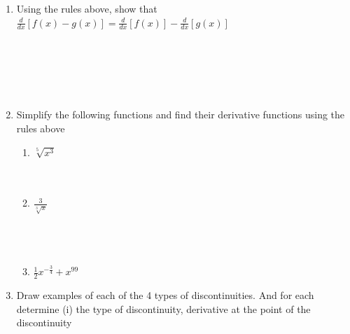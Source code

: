 \documentclass[12pt]{report}
\begin{document}
\begin{enumerate}
\item Using the rules above, show that $\displaystyle{\frac{d}{dx}\left[f(x)-g(x)\right]}=\displaystyle{\frac{d}{dx}\left[f(x)\right]-\frac{d}{dx}\left[g(x)\right]}$\\\\\\\\\\\\

\item Simplify the following functions and find their derivative functions using the rules above

\begin{enumerate}[label=\alph*.]
    \item $\displaystyle{\sqrt[5]{x^{3}}}$\\\\\\
    \item $\displaystyle{\frac{3}{\sqrt[3]{x}}}$\\\\\\\\
    \item $\displaystyle{\frac{1}{2}x^{-\frac{3}{4}}}+x^{99}$
\end{enumerate}
\newpage
\item Draw examples of each of the 4 types of discontinuities. And for each determine (i) the type of discontinuity,  derivative at the point of the discontinuity 
\end{enumerate}
\end{document}
